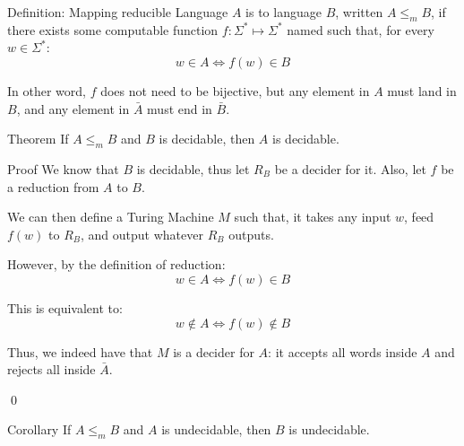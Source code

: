 \documentclass[a4paper]{article}
\begin{document}
\begin{parag}{Definition: Mapping reducible}
    Language $A$ is  to language $B$, written $A \leq_m B$, if there exists some computable function $f: \Sigma^* \mapsto \Sigma^*$ named  such that, for every $w \in \Sigma^*$: 
    \[w \in A \iff f\left(w\right) \in B\]

    In other word, $f$ does not need to be bijective, but any element in $A$ must land in $B$, and any element in $\bar{A}$ must end in $\bar{B}$.
\end{parag}

\begin{parag}{Theorem}
    If $A \leq_m B$ and $B$ is decidable, then $A$ is decidable.

    \begin{subparag}{Proof}
        We know that $B$ is decidable, thus let $R_B$ be a decider for it. Also, let $f$ be a reduction from $A$ to $B$.

        We can then define a Turing Machine $M$ such that, it takes any input $w$, feed $f\left(w\right)$ to $R_B$, and output whatever $R_B$ outputs.

        However, by the definition of reduction: 
        \[w \in A \iff f\left(w\right) \in B\] 

        This is equivalent to:
        \[w \not\in A \iff f\left(w\right) \not\in B\]
        
        Thus, we indeed have that $M$ is a decider for $A$: it accepts all words inside $A$ and rejects all inside $\bar{A}$.

        \qed
    \end{subparag}
\end{parag}

\begin{parag}{Corollary}
    If $A \leq_m B$ and $A$ is undecidable, then $B$ is undecidable.
\end{parag}
\end{document}
